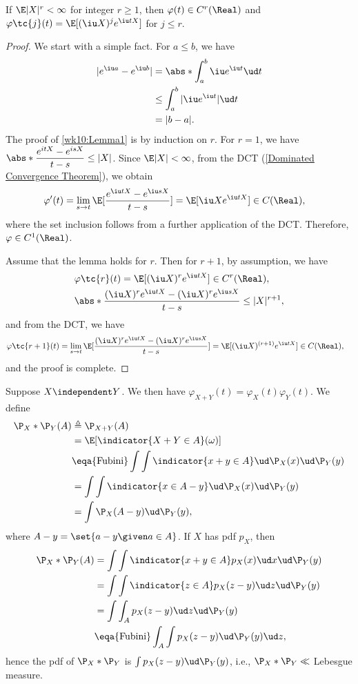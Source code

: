 \documentclass[../aipt.tex]{subfiles}
\begin{document}
\begin{Lemma}\label{wk10:Lemma1}
If $\E|X|^r< \infty$ for integer $r\geq1$, then $\varphi(t)\in C^r(\Real)$ and $\varphi\tc{j}(t)=\E [(\iu X)^j e^{\iu tX}]$ for $j\leq r$.
\end{Lemma}
\begin{proof}
We start with a simple fact. For $a\leq b$, we have
\begin{align*}
|e^{\iu a}-e^{\iu b}| 	
& = \abs*{\int _a^b \iu e^{\iu t} \ud t}\\
& \leq \int _a^b |\iu e^{\iu t}| \ud t\\
& = |b-a|.
\end{align*}
The proof of \cref{wk10:Lemma1} is by induction on $r$. For $r=1$, we have $\abs*{\dfrac{e^{itX}-e^{isX}}{t-s}}\leq |X|$. Since $\E |X| < \infty$, from the DCT (\cref{Dominated Convergence Theorem}), we obtain 
\begin{align*}
\varphi'(t)	& =\lim_{s\to t}\E[\frac{e^{\iu tX}-e^{\iu sX}}{t-s}] = \E[\iu Xe^{\iu tX}]\in C(\Real),
\end{align*}
where the set inclusion follows from a further application of the DCT. Therefore, $\varphi \in C^1(\Real)$.

Assume that the lemma holds for $r$. Then for $r+1$, by assumption, we have
\begin{align*}
&\varphi\tc{r}(t) = \E [(\iu X)^r e^{\iu tX}]\in C^r(\Real),\\
&\abs*{\frac{(\iu X)^r e^{\iu tX}-(\iu X)^r e^{\iu sX}}{t-s}} \leq |X|^{r+1},
\end{align*}
and from the DCT, we have
\begin{align*}
\varphi\tc{r+1}(t)	& =\lim_{s\to t}\E[\frac{(\iu X)^r e^{\iu tX}-(\iu X)^r e^{\iu sX}}{t-s}] = \E[(\iu X)^{(r+1)}e^{\iu tX}]\in C(\Real),
\end{align*}
and the proof is complete.
\end{proof}

Suppose $X\independent Y$. We then have $\varphi_{X+Y}(t)=\varphi_X(t)\varphi_Y(t)$. We define 
\begin{align*}
\P_X *\P_Y(A)	& \triangleq \P_{X+Y}(A) \\
& = \E[\indicator{X+Y\in A} (\omega)]\\
& \eqa{\text{Fubini}} \int \int \indicator{x+y\in A} \ud \P_X(x) \ud \P_Y(y)\\
& = \int \int \indicator{x\in A-y} \ud \P_X(x) \ud \P_Y(y)\\
& = \int \P_X(A-y)\ud \P_Y(y),
\end{align*}
where $A-y = \set{a-y \given a\in A}$. If $X$ has pdf $p_X$, then
\begin{align*}
\P_X *\P_Y(A)	
& = \int \int \indicator{x+y\in A} p_X(x) \ud x \ud \P_Y(y) \\
& = \int\int \indicator{z\in A} p_X(z-y) \ud z \ud \P_Y(y) \\
& = \int\int_A p_X(z-y) \ud z \ud \P_Y(y) \\
& \eqa{\text{Fubini}} \int_A\int p_X(z-y) \ud \P_Y(y) \ud z,
\end{align*}
hence the pdf of $\P_X *\P_Y$ is $\int p_X(z-y) \ud \P_Y(y)$, i.e., $\P_X *\P_Y \ll$ Lebesgue measure.
\end{document}
